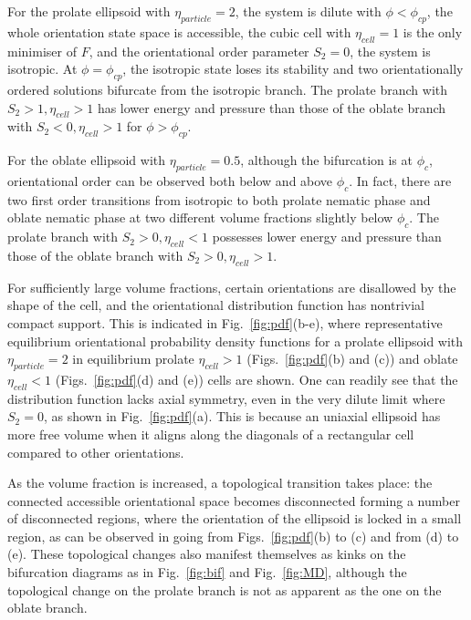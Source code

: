 \documentclass{article}
\begin{document}
For the prolate ellipsoid with $\eta_{particle}=2$, the system is dilute
with $\phi <\phi _{cp}$, the whole orientation state space is accessible,
the cubic cell with $\eta_{cell} =1$ is the only minimiser of $F$, and the
orientational order parameter $S_{2}=0$, the system is isotropic. At $\phi
=\phi _{cp}$, the isotropic state loses its stability and two
orientationally ordered solutions bifurcate from the isotropic branch. The
prolate branch with $S_2>1, \eta_{cell}>1$ has lower energy and pressure
than those of the oblate branch with $S_2<0, \eta_{cell}>1$ for $%
\phi>\phi_{cp}$.

For the oblate ellipsoid with $\eta _{particle}=0.5$, although the
bifurcation is at $\phi _{c}$, orientational order can be observed both
below and above $\phi _{c}$. In fact, there are two first order transitions
from isotropic to both prolate nematic phase and oblate nematic phase at two
different volume fractions slightly below $\phi _{c}$. The prolate branch
with $S_{2}>0,\eta _{cell}<1$ possesses lower energy and pressure than those
of the oblate branch with $S_{2}>0,\eta _{cell}>1$.


For sufficiently large volume fractions, certain orientations are disallowed
by the shape of the cell, and the orientational distribution function has
nontrivial compact support. This is indicated in Fig.~\ref{fig:pdf}(b-e),
where representative equilibrium orientational probability density functions
for a prolate ellipsoid with $\eta _{particle}=2$ in equilibrium prolate $%
\eta _{cell}>1$ (Figs.~\ref{fig:pdf}(b) and (c)) and oblate $\eta _{cell}<1$
(Figs.~\ref{fig:pdf}(d) and (e)) cells are shown. One can readily see that
the distribution function lacks axial symmetry, even in the very dilute
limit where $S_{2}=0$, as shown in Fig.~\ref{fig:pdf}(a). This is because an
uniaxial ellipsoid has more free volume when it aligns along the diagonals
of a rectangular cell compared to other orientations. 

As the volume fraction
is increased, a topological transition takes place: the connected accessible
orientational space becomes disconnected forming a number of disconnected regions, where the orientation of
the ellipsoid is locked in a small region, as can be observed in going from
Figs.~\ref{fig:pdf}(b) to (c) and from (d) to (e). These topological changes also manifest themselves as kinks on the bifurcation diagrams as in Fig.~\ref{fig:bif} and Fig.~\ref{fig:MD}, although the topological change on the prolate branch is not as apparent as the one on the oblate branch.
\end{document}
